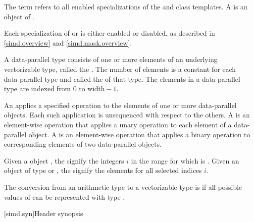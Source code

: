 \pnum
The term  refers to all enabled specializations of
the  and  class templates. A  is
an object of .

\pnum
Each specialization of  or  is either enabled or disabled,
as described in \ref{simd.overview} and \ref{simd.mask.overview}.

\pnum
A data-parallel type consists of one or more elements of an underlying vectorizable type,
called the .
The number of elements is a constant for each data-parallel type and called the
 of that type.
The elements in a data-parallel type are indexed from 0 to $\textrm{width} - 1$.

\pnum
An  applies a specified operation to the elements of one or more
data-parallel objects. Each such application is unsequenced with respect to the others. A
 is an element-wise operation that applies a unary operation to
each element of a data-parallel object. A  is an element-wise
operation that applies a binary operation to corresponding elements of two data-parallel objects.

\pnum\label{wording.selected.indices}%
Given a  object , the
 signify the integers $i$ in the range
 for which  is .
Given an object  of type  or ,
the  signify the elements  for all selected indices $i$.

\pnum
The conversion from an arithmetic type  to a vectorizable type  is
 if
all possible values of  can be represented with type .

[simd.syn]{Header \texorpdfstring{}{<simd>} synopsis}

